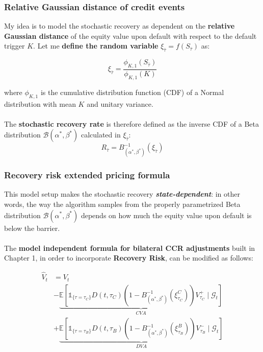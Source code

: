 \documentclass{beamer}
\begin{document}
\begin{frame}
\frametitle{Relative Gaussian distance of credit events}
	My idea is to model the stochastic recovery as dependent on the \textbf{relative Gaussian distance} of the equity value upon default with respect to the default trigger $K$.
	Let me \textbf{define the random variable} $\xi_{\bar{\tau}}= f(S_{\bar{\tau}})$ as:

	\begin{equation}
		\xi_{\bar{\tau}} = \frac{\phi_{K,1}(S_{\bar{\tau}})}{\phi_{K,1}(K)}
	\end{equation} 

	where $\phi_{K,1}$ is the cumulative distribution function (CDF) of a Normal distribution with mean $K$ and unitary variance. \\~\\
	The \textbf{stochastic recovery rate} is therefore defined as the inverse CDF of a Beta distribution $\mathcal{B}(\alpha^*, \beta^*)$ calculated in $\xi_{\bar{\tau}}$:
	\begin{equation}
		R_{\bar{\tau}} = B^{-1}_{(\alpha^*, \beta^*)}(\xi_{\bar{\tau}})
	\end{equation}

\end{frame}

\begin{frame}
\frametitle{Recovery risk extended pricing formula}
	This model setup makes the stochastic recovery \textbf{\textit{state-dependent}}: in other words, the way the algorithm samples from the properly parametrized Beta distribution $\mathcal{B}(\alpha^*, \beta^*)$ depends on how much the equity value upon default is below the barrier.
	\\~\\
	The \textbf{model independent formula for bilateral CCR adjustments} built in Chapter 1,  in order to incorporate \textbf{Recovery Risk}, can be modified as follows:

	\begin{equation}
	\begin{split}
	\hat{V}_t &= V_t \\
	&-  \underbrace{\mathbb{E}[ \mathds{1}_{ \{ \tau = \tau_{C} \} } D(t,\tau_{C}) (1-B^{-1}_{(\alpha^*, \beta^*)}(\xi^C_{\tau_C}))V_{\tau_{C}}^{+}\mid \mathcal{G}_t]}_{CVA} \\
	&+ \underbrace{ \mathbb{E}[ \mathds{1}_{ \{ \tau = \tau_{B} \} } D(t,\tau_{B}) (1-B^{-1}_{(\alpha^*, \beta^*)}(\xi^B_{\tau_B}))V_{\tau_{B}}^{-}\mid \mathcal{G}_t] }_{DVA}	
	\end{split}
	\end{equation}

\end{frame}
\end{document}
